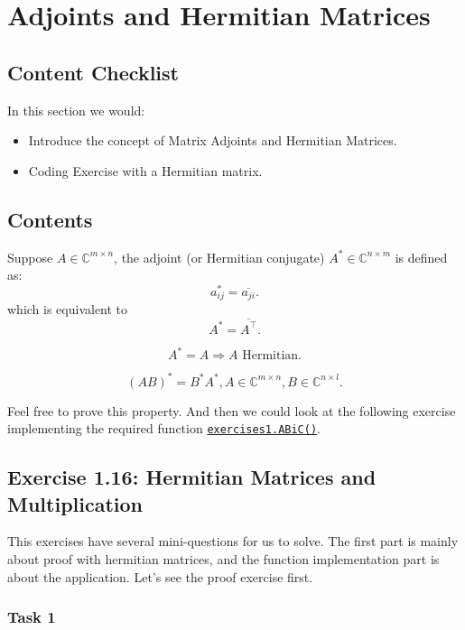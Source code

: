 \section{Adjoints and Hermitian Matrices}%
\label{sec1.7}
\subsection*{Content Checklist}
\noindent In this section we would:
\begin{itemize}
  \item Introduce the concept of Matrix Adjoints and Hermitian Matrices.
  \item Coding Exercise with a Hermitian matrix.
\end{itemize}
\subsection*{Contents}
\begin{definition}
  Suppose \(A \in \mathbb{C}^{m \times n}\), the adjoint (or Hermitian conjugate) \(A^{*} \in \mathbb{C}^{n \times m}\) is defined as:
  \[
    a^{*}_{ij} = \overline{a_{ji}}
  .\]
  which is equivalent to
  \[
    A^{*} = \overline{A^{\top}}
  .\]
\end{definition}
\begin{definition}
  \[
    A^{*} = A \Rightarrow A \text{ Hermitian}  
  .\]
\end{definition}
\begin{property}
  \[ 
  (AB)^{*} = B^{*}A^{*}, A \in \mathbb{C}^{m \times n}, B \in \mathbb{C}^{n \times l}
.\] 
\end{property}
Feel free to prove this property.
And then we could look at the following exercise implementing the required function \href{https://comp-lin-alg.github.io/cla_utils.html#cla_utils.exercises1.ABiC}{\texttt{exercises1.ABiC()}}. \checked
\subsection*{Exercise 1.16: Hermitian Matrices and Multiplication}%
This exercises have several mini-questions for us to solve. The first part is mainly about proof with hermitian matrices, and the function implementation part is about the application. Let's see the proof exercise first.

\subsubsection*{Task 1}%

